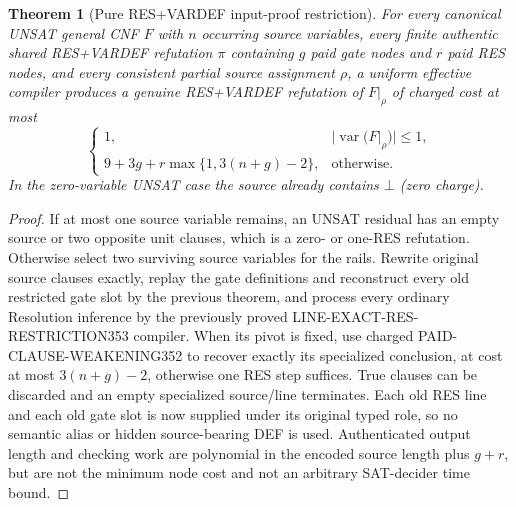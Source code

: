 \documentclass[11pt]{article}
\newtheorem{theorem}{Theorem}
\begin{document}
\begin{theorem}[Pure RES+VARDEF input-proof restriction]
For every canonical UNSAT general CNF $F$ with $n$ occurring source variables, every finite authentic shared RES+VARDEF refutation $\pi$ containing $g$ paid gate nodes and $r$ paid RES nodes, and every consistent partial source assignment $\rho$, a uniform effective compiler produces a genuine RES+VARDEF refutation of $F|_\rho$ of charged cost at most
\[
\boxed{\begin{cases}1,&|\operatorname{var}(F|_\rho)|\le1,\\
9+3g+r\max\{1,3(n+g)-2\},&\text{otherwise}.
\end{cases}}
\]
In the zero-variable UNSAT case the source already contains $\bot$ (zero charge).
\end{theorem}
\begin{proof}
If at most one source variable remains, an UNSAT residual has an empty source or two opposite unit clauses, which is a zero- or one-RES refutation. Otherwise select two surviving source variables for the rails. Rewrite original source clauses exactly, replay the gate definitions and reconstruct every old restricted gate slot by the previous theorem, and process every ordinary Resolution inference by the previously proved LINE-EXACT-RES-RESTRICTION353 compiler. When its pivot is fixed, use charged PAID-CLAUSE-WEAKENING352 to recover exactly its specialized conclusion, at cost at most $3(n+g)-2$, otherwise one RES step suffices. True clauses can be discarded and an empty specialized source/line terminates. Each old RES line and each old gate slot is now supplied under its original typed role, so no semantic alias or hidden source-bearing DEF is used. Authenticated output length and checking work are polynomial in the encoded source length plus $g+r$, but are not the minimum node cost and not an arbitrary SAT-decider time bound.
\end{proof}
\end{document}
